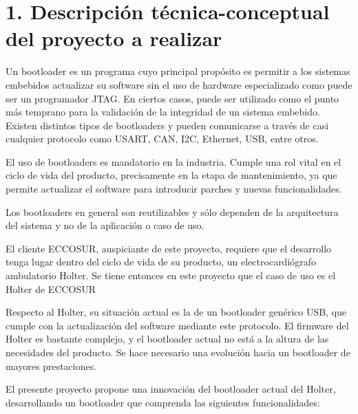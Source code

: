 \documentclass[
11pt, %
]{charter}
\begin{document}
\section{1. Descripción técnica-conceptual del proyecto a realizar}
\label{sec:descripcion}

Un bootloader es un programa cuyo principal propósito es permitir a los sistemas embebidos actualizar su software sin el uso de hardware especializado como puede ser un programador JTAG. En ciertos casos, puede ser utilizado como el punto más temprano para la validación de la integridad de un sistema embebido. Existen distintos tipos de bootloaders y pueden comunicarse a través de casi cualquier protocolo como USART, CAN, I2C, Ethernet, USB, entre otros.

El uso de bootloaders es mandatorio en la industria. Cumple una rol vital en el ciclo de vida del producto, precisamente en la etapa de mantenimiento, ya que permite actualizar el software para introducir parches y nuevas funcionalidades.

Los bootloaders en general son reutilizables y sólo dependen de la arquitectura del sistema y no de la aplicación o caso de uso.

El cliente ECCOSUR, auspiciante de este proyecto, requiere que el desarrollo tenga lugar dentro del ciclo de vida de su producto, un electrocardiógrafo ambulatorio Holter. Se tiene entonces en este proyecto que el caso de uso es el Holter de ECCOSUR

Respecto al Holter, su situación actual es la de un bootloader genérico USB, que cumple con la actualización del software mediante este protocolo. El firmware del Holter es bastante complejo, y el bootloader actual no está a la altura de las necesidades del producto. Se hace necesario una evolución hacia un bootloader de mayores prestaciones.

El presente proyecto propone una innovación del bootloader actual del Holter, desarrollando un bootloader que comprenda las siguientes funcionalidades:
\end{document}
